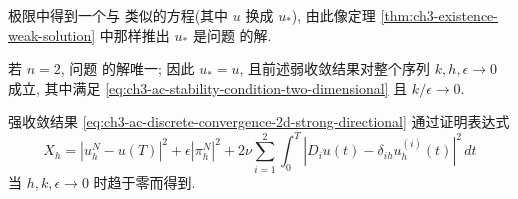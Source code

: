 \begin{Proof}
极限中得到一个与  类似的方程(其中 $u$ 换成 $u_*$), 由此像定理 \ref{thm:ch3-existence-weak-solution} 中那样推出 $u_*$ 是问题  的解.

若 $n=2$, 问题  的解唯一; 因此 $u_*=u$, 且前述弱收敛结果对整个序列 $k,h,\epsilon\to0$ 成立, 其中满足 \eqref{eq:ch3-ac-stability-condition-two-dimensional} 且 $k/\epsilon\to0$.

强收敛结果 \eqref{eq:ch3-ac-discrete-convergence-2d-strong-directional} 通过证明表达式
\[
X_h=|u_h^N-u(T)|^2+\epsilon|\pi_h^N|^2
+2\nu\sum_{i=1}^2\int_0^T
|D_i u(t)-\delta_{ih}u_h^{(i)}(t)|^2\,dt
\]
当 $h,k,\epsilon\to0$ 时趋于零而得到.
\end{Proof}
